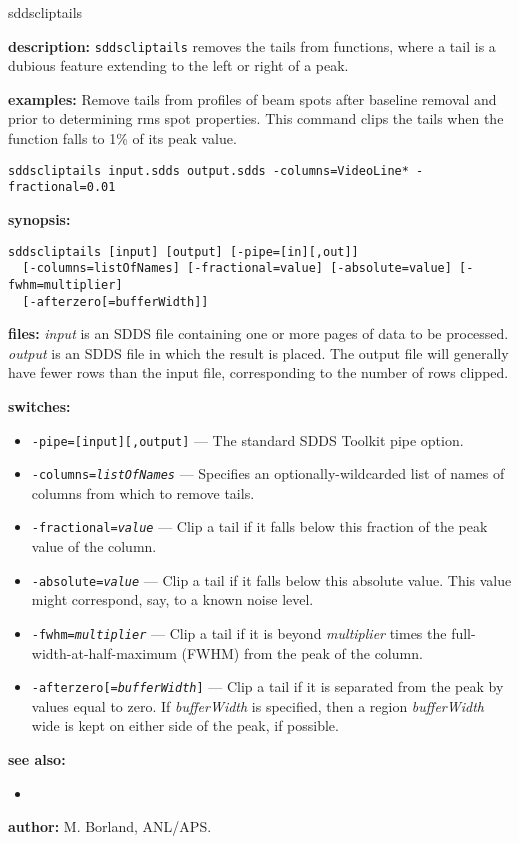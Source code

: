 \begin{sddsprog}{sddscliptails}
  \item \textbf{description:}
  \verb|sddscliptails| removes the tails from functions, where a tail is a dubious feature
  extending to the left or right of a peak.
  \item \textbf{examples:}
  Remove tails from profiles of beam spots after baseline removal and prior to determining
  rms spot properties. This command clips the tails when the function falls to 1\% of
  its peak value.
  \begin{verbatim}
sddscliptails input.sdds output.sdds -columns=VideoLine* -fractional=0.01
  \end{verbatim}
  \item \textbf{synopsis:}
  \begin{verbatim}
sddscliptails [input] [output] [-pipe=[in][,out]]
  [-columns=listOfNames] [-fractional=value] [-absolute=value] [-fwhm=multiplier]
  [-afterzero[=bufferWidth]]
  \end{verbatim}
  \item \textbf{files:}
  {\em input} is an SDDS file containing one or more pages of data to be processed.
  {\em output} is an SDDS file in which the result is placed. The output file will
  generally have fewer rows than the input file, corresponding to the number of
  rows clipped.
  \item \textbf{switches:}
    \begin{itemize}
    \item {\tt -pipe=[input][,output]} --- The standard SDDS Toolkit pipe option.
    \item {\tt -columns={\em listOfNames}} --- Specifies an optionally-wildcarded list
      of names of columns from which to remove tails.
    \item {\tt -fractional={\em value}} --- Clip a tail if it falls below this fraction of the peak
      value of the column.
    \item {\tt -absolute={\em value}} --- Clip a tail if it falls below this absolute value. This
      value might correspond, say, to a known noise level.
    \item {\tt -fwhm={\em multiplier}} --- Clip a tail if it is beyond {\em multiplier} times
      the full-width-at-half-maximum (FWHM) from the peak of the column.
    \item {\tt -afterzero[={\em bufferWidth}]} --- Clip a tail if it is separated from the
      peak by values equal to zero.
      If {\em bufferWidth} is specified, then a region {\em bufferWidth} wide is kept
      on either side of the peak, if possible.
    \end{itemize}
  \item \textbf{see also:}
    \begin{itemize}
    \item {}
    \end{itemize}
  \item \textbf{author:} M. Borland, ANL/APS.
\end{sddsprog}

